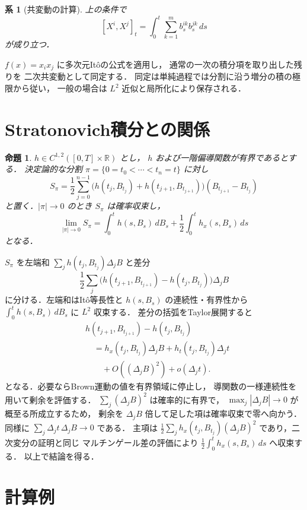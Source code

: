 \documentclass[a5paper,10pt,onecolumn]{jsarticle}
\makeatletter
\theoremstyle{mathnotetheorem}
\newtheorem{proposition}[theorem]{命題}
\newtheorem{corollary}[theorem]{系}
\renewcommand{\proofname}{証明}
\renewenvironment{proof}[1][\proofname]{%
  \par\pushQED{\qed}\normalfont\topsep4\p@\@plus2\p@\relax
  \trivlist\item[\hskip\labelsep\bfseries #1]\ignorespaces
}{\popQED\endtrivlist\@endpefalse}
\makeatother
\begin{document}
\begin{corollary}[共変動の計算]
上の条件で
\[
 [X^i,X^j]_t
 =\int_0^t\sum_{k=1}^m b_s^{ik}b_s^{jk}\,ds
\]
が成り立つ．
\end{corollary}
\begin{proof}
$f(x)=x_ix_j$ に多次元It\^oの公式を適用し，
通常の一次の積分項を取り出した残りを
二次共変動として同定する．
同定は単純過程では分割に沿う増分の積の極限から従い，
一般の場合は $L^2$ 近似と局所化により保存される．
\end{proof}

\section{Stratonovich積分との関係}

\begin{proposition}\label{prop:stratonovich}
$h\in C^{1,2}([0,T]\times\mathbb R)$ とし，
$h$ および一階偏導関数が有界であるとする．
決定論的な分割 $\pi=\{0=t_0<\cdots<t_n=t\}$ に対し
\[
 S_\pi=\frac12\sum_{j=0}^{n-1}
 \bigl(h(t_j,B_{t_j})+h(t_{j+1},B_{t_{j+1}})\bigr)
 (B_{t_{j+1}}-B_{t_j})
\]
と置く．$|\pi|\to0$ のとき $S_\pi$ は確率収束し，
\[
 \lim_{|\pi|\to0}S_\pi
 =\int_0^th(s,B_s)\,dB_s
   +\frac12\int_0^th_x(s,B_s)\,ds
\]
となる．
\end{proposition}
\begin{proof}
$S_\pi$ を左端和
$\sum_jh(t_j,B_{t_j})\Delta_jB$ と差分
\[
 \frac12\sum_j
 \bigl(h(t_{j+1},B_{t_{j+1}})
       -h(t_j,B_{t_j})\bigr)\Delta_jB
\]
に分ける．左端和はIt\^o等長性と
$h(s,B_s)$ の連続性・有界性から
$\int_0^th(s,B_s)\,dB_s$ に $L^2$ 収束する．
差分の括弧をTaylor展開すると
\[
 \begin{aligned}
 &h(t_{j+1},B_{t_{j+1}})-h(t_j,B_{t_j})\\
 &\quad=h_x(t_j,B_{t_j})\Delta_jB
       +h_t(t_j,B_{t_j})\Delta_jt\\
 &\qquad+O((\Delta_jB)^2)+o(\Delta_jt).
 \end{aligned}
\]
となる．必要ならBrown運動の値を有界領域に停止し，
導関数の一様連続性を用いて剰余を評価する．
$\sum_j(\Delta_jB)^2$ は確率的に有界で，
$\max_j|\Delta_jB|\to0$ が概至る所成立するため，
剰余を $\Delta_jB$ 倍して足した項は確率収束で零へ向かう．
同様に $\sum_j\Delta_jt\,\Delta_jB\to0$ である．
主項は
$\frac12\sum_jh_x(t_j,B_{t_j})(\Delta_jB)^2$
であり，二次変分の証明と同じ
マルチンゲール差の評価により
$\frac12\int_0^th_x(s,B_s)\,ds$ へ収束する．
以上で結論を得る．
\end{proof}

\section{計算例}
\end{document}
